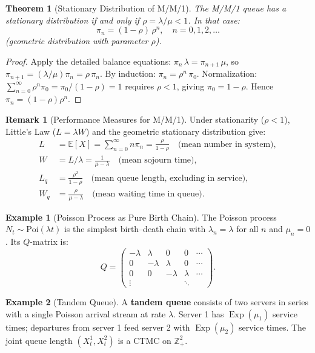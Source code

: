 \documentclass[12pt, a4paper]{article}
\theoremstyle{definition}
\newtheorem{example}{Example}[section]
\newtheorem{remark}{Remark}[section]
\theoremstyle{plain}
\newtheorem{theorem}{Theorem}[section]
\DeclareMathOperator{\Exp}{Exp}
\newcommand{\EE}{\mathbb{E}}
\begin{document}
\begin{theorem}[Stationary Distribution of M/M/1]
The M/M/1 queue has a stationary distribution if and only if $\rho = \lambda/\mu < 1$. In that case:
\[
  \pi_n = (1-\rho)\,\rho^n, \quad n=0,1,2,\ldots
\]
(geometric distribution with parameter $\rho$).
\end{theorem}

\begin{proof}
Apply the detailed balance equations: $\pi_n\,\lambda = \pi_{n+1}\,\mu$, so $\pi_{n+1} = (\lambda/\mu)\pi_n = \rho\,\pi_n$.
By induction: $\pi_n = \rho^n\,\pi_0$.
Normalization: $\sum_{n=0}^\infty \rho^n\pi_0 = \pi_0/(1-\rho) = 1$ requires $\rho<1$, giving $\pi_0=1-\rho$.
Hence $\pi_n = (1-\rho)\rho^n$.
\end{proof}

\begin{remark}[Performance Measures for M/M/1]
Under stationarity ($\rho<1$), Little's Law ($L=\lambda W$) and the geometric stationary distribution give:
\begin{align*}
  L &= \EE[X] = \sum_{n=0}^\infty n\pi_n = \frac{\rho}{1-\rho} \quad \text{(mean number in system)},\\
  W &= L/\lambda = \frac{1}{\mu-\lambda} \quad \text{(mean sojourn time)},\\
  L_q &= \frac{\rho^2}{1-\rho} \quad \text{(mean queue length, excluding in service)},\\
  W_q &= \frac{\rho}{\mu-\lambda} \quad \text{(mean waiting time in queue)}.
\end{align*}
\end{remark}

\begin{example}[Poisson Process as Pure Birth Chain]
The Poisson process $N_t \sim \text{Poi}(\lambda t)$ is the simplest birth--death chain with $\lambda_n = \lambda$ for all $n$ and $\mu_n = 0$. Its $Q$-matrix is:
\[
Q = \begin{pmatrix} -\lambda & \lambda & 0 & 0 & \cdots \\ 0 & -\lambda & \lambda & 0 & \cdots \\ 0 & 0 & -\lambda & \lambda & \cdots \\ \vdots & & & \ddots \end{pmatrix}.
\]
\end{example}

\begin{example}[Tandem Queue]
A \textbf{tandem queue} consists of two servers in series with a single Poisson arrival stream at rate $\lambda$. Server 1 has $\Exp(\mu_1)$ service times; departures from server 1 feed server 2 with $\Exp(\mu_2)$ service times. The joint queue length $(X_t^1, X_t^2)$ is a CTMC on $\mathbb{Z}_+^2$.
\end{example}
\end{document}
